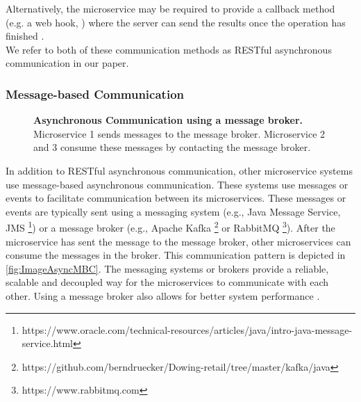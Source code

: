 Alternatively, the microservice may be required to provide a callback method (e.g. a web hook, \cite{Webhooks}) where the server can send the results once the operation has finished \cite{Mayer2018}. \\

We refer to both of these communication methods as RESTful asynchronous communication in our paper.


\subsubsection{Message-based Communication}
\label{sec:Foundation:AsyncCommunication:MBC}

\begin{figure}
\centering
{}
\caption{\textbf{Asynchronous Communication using a message broker.} \\
Microservice 1 sends messages to the message broker. Microservice 2 and 3 consume these messages by contacting the message broker.}
\label{fig:ImageAsyncMBC}
\end{figure}

In addition to RESTful asynchronous communication, other microservice systems use message-based asynchronous communication.
These systems use messages or events to facilitate communication between its microservices.
These messages or events are typically sent using a messaging system (e.g., Java Message Service, JMS \footnote{https://www.oracle.com/technical-resources/articles/java/intro-java-message-service.html}) or a message broker (e.g., Apache Kafka \footnote{https://github.com/berndruecker/Dowing-retail/tree/master/kafka/java} or RabbitMQ \footnote{https://www.rabbitmq.com}).
After the microservice has sent the message to the message broker, other microservices can consume the messages in the broker.
This communication pattern is depicted in \autoref{fig:ImageAsyncMBC}.
The messaging systems or brokers provide a reliable, scalable and decoupled way for the microservices to communicate with each other.
Using a message broker also allows for better system performance \cite{Singh2021}.



